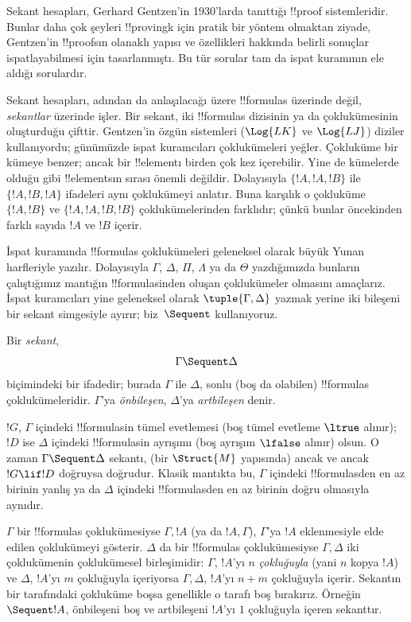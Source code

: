 \documentclass[../../../include/open-logic-section]{subfiles}
\begin{document}


Sekant hesapları, Gerhard Gentzen'in 1930'larda tanıttığı !!{proof}
sistemleridir. Bunlar daha çok şeyleri !!{proving}{}k için pratik bir
yöntem olmaktan ziyade, Gentzen'in !!{proof}s{}ın olanaklı yapısı ve özellikleri
hakkında belirli sonuçlar ispatlayabilmesi için tasarlanmıştı. Bu tür sorular
tam da ispat kuramının ele aldığı sorulardır.

Sekant hesapları, adından da anlaşılacağı üzere !!{formula}s üzerinde değil,
\emph{sekantlar} üzerinde işler. Bir sekant, iki !!{formula}s dizisinin ya da
çoklukümesinin oluşturduğu çifttir. Gentzen'in özgün sistemleri ($\Log{LK}$ ve
$\Log{LJ}$) diziler kullanıyordu; günümüzde ispat kuramcıları çoklukümeleri
yeğler. Çokluküme bir kümeye benzer; ancak bir !!{element}{}ı birden çok kez
içerebilir. Yine de kümelerde olduğu gibi !!{element}s{}ın sırası önemli
değildir. Dolayısıyla $\{!A,!A,!B\}$ ile $\{!A,!B,!A\}$ ifadeleri aynı
çoklukümeyi anlatır. Buna karşılık o çokluküme $\{!A,!B\}$ ve
$\{!A,!A,!B,!B\}$ çoklukümelerinden farklıdır; çünkü bunlar öncekinden farklı
sayıda $!A$ ve $!B$ içerir.

İspat kuramında !!{formula}s çoklukümeleri geleneksel olarak büyük Yunan
harfleriyle yazılır. Dolayısıyla $\Gamma$, $\Delta$, $\Pi$, $\Lambda$ ya da
$\Theta$ yazdığımızda bunların çalıştığımız mantığın !!{formula}s{}inden oluşan
çoklukümeler olmasını amaçlarız. İspat kuramcıları yine geleneksel olarak
$\tuple{\Gamma,\Delta}$ yazmak yerine iki bileşeni bir sekant simgesiyle
ayırır; biz~$\Sequent$ kullanıyoruz.

\begin{defn}[Sekant]
Bir \emph{sekant},
\[
\Gamma \Sequent \Delta
\]
biçimindeki bir ifadedir; burada $\Gamma$ ile $\Delta$, sonlu (boş da
olabilen) !!{formula}s çoklukümeleridir. $\Gamma$'ya \emph{önbileşen},
$\Delta$'ya \emph{artbileşen} denir.
\end{defn}

$!G$, $\Gamma$ içindeki !!{formula}s{}in tümel evetlemesi (boş tümel evetleme
$\ltrue$ alınır); $!D$ ise $\Delta$ içindeki !!{formula}s{}in ayrışımı (boş
ayrışım $\lfalse$ alınır) olsun. O zaman $\Gamma \Sequent \Delta$ sekantı,
(bir $\Struct{M}$ yapısında) ancak ve ancak $!G \lif !D$ doğruysa doğrudur.
Klasik mantıkta bu, $\Gamma$ içindeki !!{formula}s{}den en az birinin yanlış ya
da $\Delta$ içindeki !!{formula}s{}den en az birinin doğru olmasıyla aynıdır.

$\Gamma$ bir !!{formula}s çoklukümesiyse $\Gamma,!A$ (ya da $!A,\Gamma$),
$\Gamma$'ya $!A$ eklenmesiyle elde edilen çoklukümeyi gösterir. $\Delta$ da
bir !!{formula}s çoklukümesiyse $\Gamma,\Delta$ iki çoklukümenin
çoklukümesel birleşimidir: $\Gamma$, $!A$'yı $n$ \emph{çokluğuyla} (yani
$n$ kopya $!A$) ve $\Delta$, $!A$'yı $m$ çokluğuyla içeriyorsa
$\Gamma,\Delta$, $!A$'yı $n+m$ çokluğuyla içerir. Sekantın bir tarafındaki
çokluküme boşsa genellikle o tarafı boş bırakırız. Örneğin $\Sequent !A$,
önbileşeni boş ve artbileşeni $!A$'yı $1$ çokluğuyla içeren sekanttır.
\end{document}
